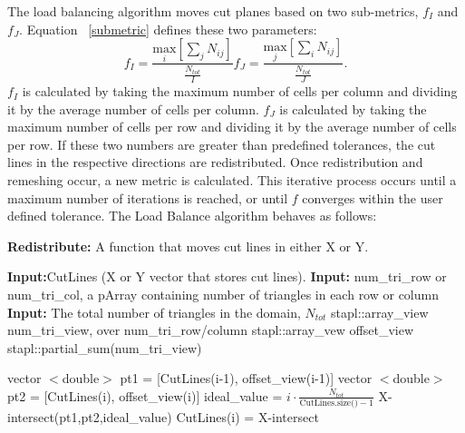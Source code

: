 \documentclass{anstrans}
\begin{document}
The load balancing algorithm moves cut planes based on two sub-metrics, $f_I$ and $f_J$. Equation ~\eqref{submetric} defines these two parameters:
\begin{subequations}
\label{submetric}
\begin{equation}
f_I = \frac{ \underset{i}{\text{max}}[\sum_{j} N_{ij}] } {\frac{N_{tot}}{I}} 
\end{equation}
\begin{equation}
f_J = \frac{\underset{j}{\text{max}}[\sum_{i} N_{ij}] } {\frac{N_{tot}}{J}}.
\end{equation}
\end{subequations}
%
$f_I$ is calculated by taking the maximum number of cells per column and dividing it by the average number of cells per column. $f_J$ is calculated by taking the maximum number of cells per row and dividing it by the average number of cells per row. If these two numbers are greater than predefined tolerances, the cut lines in the respective directions are redistributed. Once redistribution and remeshing occur, a new metric is calculated. This iterative process occurs until a maximum number of iterations is reached, or until $f$ converges within the user defined tolerance. The Load Balance algorithm behaves as follows:



\begin{algorithm}
\textbf{Redistribute:} A function that moves cut lines in either X or Y. \\
\begin{algorithmic}
\STATE \textbf{Input:}CutLines (X or Y vector that stores cut lines). 
\STATE \textbf{Input:} num\_tri\_row or num\_tri\_col, a pArray containing number of triangles in each row or column 
\STATE \textbf{Input:} The total number of triangles in the domain, $N_{tot}$
\STATE stapl::array\_view num\_tri\_view, over num\_tri\_row/column
\STATE stapl::array\_vew offset\_view
\STATE stapl::partial\_sum(num\_tri\_view) 

	\STATE vector $<$double$>$ pt1 = [CutLines(i-1), offset\_view(i-1)]
	\STATE vector $<$double$>$ pt2 = [CutLines(i), offset\_view(i)]
	\STATE ideal\_value = $i\cdot \frac{N_{tot}}{\text{CutLines.size()}-1}$
	\STATE X-intersect(pt1,pt2,ideal\_value) 
	\STATE CutLines(i) = X-intersect
\ENDFOR
\end{algorithmic}
\end{algorithm}
\end{document}
